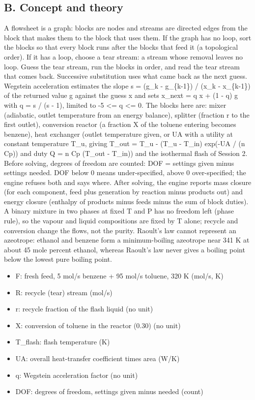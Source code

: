 \documentclass[11pt,a4paper]{article}
\begin{document}
\subsection*{B. Concept and theory}
A flowsheet is a graph: blocks are nodes and streams are directed edges from the block that makes them to the block that uses them. If the graph has no loop, sort the blocks so that every block runs after the blocks that feed it (a topological order). If it has a loop, choose a tear stream: a stream whose removal leaves no loop. Guess the tear stream, run the blocks in order, and read the tear stream that comes back. Successive substitution uses what came back as the next guess. Wegstein acceleration estimates the slope s = (g\_k - g\_\{k-1\}) / (x\_k - x\_\{k-1\}) of the returned value g against the guess x and sets x\_next = q x + (1 - q) g with q = s / (s - 1), limited to -5 \textless{}= q \textless{}= 0. The blocks here are: mixer (adiabatic, outlet temperature from an energy balance), splitter (fraction r to the first outlet), conversion reactor (a fraction X of the toluene entering becomes benzene), heat exchanger (outlet temperature given, or UA with a utility at constant temperature T\_u, giving T\_out = T\_u - (T\_u - T\_in) exp(-UA / (n Cp)) and duty Q = n Cp (T\_out - T\_in)) and the isothermal flash of Session 2. Before solving, degrees of freedom are counted: DOF = settings given minus settings needed. DOF below 0 means under-specified, above 0 over-specified; the engine refuses both and says where. After solving, the engine reports mass closure (for each component, feed plus generation by reaction minus products out) and energy closure (enthalpy of products minus feeds minus the sum of block duties). A binary mixture in two phases at fixed T and P has no freedom left (phase rule), so the vapour and liquid compositions are fixed by T alone; recycle and conversion change the flows, not the purity. Raoult's law cannot represent an azeotrope: ethanol and benzene form a minimum-boiling azeotrope near 341 K at about 45 mole percent ethanol, whereas Raoult's law never gives a boiling point below the lowest pure boiling point.

\begin{itemize}[nosep]
\item F: fresh feed, 5 mol/s benzene + 95 mol/s toluene, 320 K (mol/s, K)
\item R: recycle (tear) stream (mol/s)
\item r: recycle fraction of the flash liquid (no unit)
\item X: conversion of toluene in the reactor (0.30) (no unit)
\item T\_flash: flash temperature (K)
\item UA: overall heat-transfer coefficient times area (W/K)
\item q: Wegstein acceleration factor (no unit)
\item DOF: degrees of freedom, settings given minus needed (count)
\end{itemize}
\end{document}
